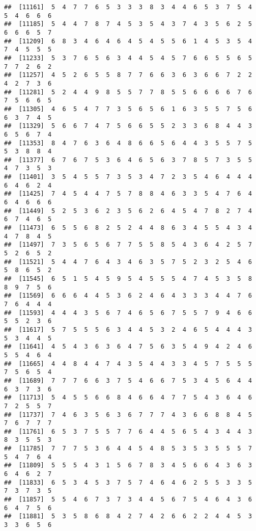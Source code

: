 \documentclass[
]{book}
\begin{document}
\begin{verbatim}
##  [11161]  5  4  7  7  6  5  3  3  3  8  3  4  4  6  5  3  7  5  4  5  4  6  6  6
##  [11185]  5  4  4  7  8  7  4  5  3  5  4  3  7  4  3  5  6  2  5  6  6  6  5  7
##  [11209]  6  8  3  4  6  4  6  4  5  4  5  5  6  1  4  5  3  5  4  7  4  5  5  5
##  [11233]  5  3  7  6  5  6  3  4  4  5  4  5  7  6  6  5  5  6  5  7  7  2  6  2
##  [11257]  4  5  2  6  5  5  8  7  7  6  6  3  6  3  6  6  7  2  2  4  2  7  3  6
##  [11281]  5  2  4  4  9  8  5  5  7  7  8  5  5  6  6  6  6  7  6  7  5  6  6  5
##  [11305]  4  6  5  4  7  7  3  5  6  5  6  1  6  3  5  5  7  5  6  6  3  7  4  5
##  [11329]  5  6  6  7  4  7  5  6  6  5  5  2  3  3  6  8  4  4  3  6  5  6  7  4
##  [11353]  8  4  7  6  3  6  4  8  6  6  5  6  4  4  3  5  5  7  5  5  3  8  8  4
##  [11377]  6  7  6  7  5  3  6  4  6  5  6  3  7  8  5  7  3  5  5  4  7  3  5  3
##  [11401]  3  5  4  5  5  7  3  5  3  4  7  2  3  5  4  6  4  4  4  6  4  6  2  4
##  [11425]  7  4  5  4  4  7  5  7  8  8  4  6  3  3  5  4  7  6  4  6  4  6  6  6
##  [11449]  5  2  5  3  6  2  3  5  6  2  6  4  5  4  7  8  2  7  4  6  7  4  6  5
##  [11473]  6  5  5  6  8  2  5  2  4  4  8  6  3  4  5  5  4  3  4  4  7  8  4  5
##  [11497]  7  3  5  6  5  6  7  7  5  5  8  5  4  3  6  4  2  5  7  5  2  6  5  2
##  [11521]  5  4  4  7  6  4  3  4  6  3  5  7  5  2  3  2  5  4  6  5  8  6  5  2
##  [11545]  6  5  1  5  4  5  9  5  4  5  5  5  4  7  4  5  3  5  8  8  9  7  5  6
##  [11569]  6  6  6  4  4  5  3  6  2  4  6  4  3  3  3  4  4  7  6  7  6  4  4  4
##  [11593]  4  4  4  3  5  6  7  4  6  5  6  7  5  5  7  9  4  6  6  5  5  2  3  6
##  [11617]  5  7  5  5  5  6  3  4  4  5  3  2  4  6  5  4  4  4  3  5  3  4  4  5
##  [11641]  4  5  4  3  6  3  6  4  7  5  6  3  5  4  9  4  2  4  6  5  5  4  6  4
##  [11665]  4  4  8  4  4  7  4  3  5  4  4  3  3  4  5  7  5  5  5  7  5  6  5  4
##  [11689]  7  7  7  6  6  3  7  5  4  6  6  7  5  3  4  5  6  4  4  6  3  7  3  6
##  [11713]  5  4  5  5  6  6  8  4  6  6  4  7  7  5  4  3  6  4  6  7  2  5  5  7
##  [11737]  7  4  6  3  5  6  3  6  7  7  7  4  3  6  6  8  8  4  5  7  6  7  7  7
##  [11761]  6  5  3  7  5  5  7  7  6  4  4  5  6  5  4  3  4  4  3  8  3  5  5  3
##  [11785]  7  7  7  5  3  6  4  4  5  4  8  5  3  5  3  5  5  5  7  5  4  7  6  4
##  [11809]  5  5  5  4  3  1  5  6  7  8  3  4  5  6  6  4  3  6  3  6  4  6  2  7
##  [11833]  6  5  3  4  5  3  7  5  7  4  6  4  6  2  5  5  3  3  5  7  3  7  3  5
##  [11857]  5  5  4  6  7  3  7  3  4  4  5  6  7  5  4  6  4  3  6  6  4  7  5  6
##  [11881]  5  3  5  8  6  8  4  2  7  4  2  6  6  2  2  4  4  5  3  3  3  6  5  6

\end{verbatim}
\end{document}
